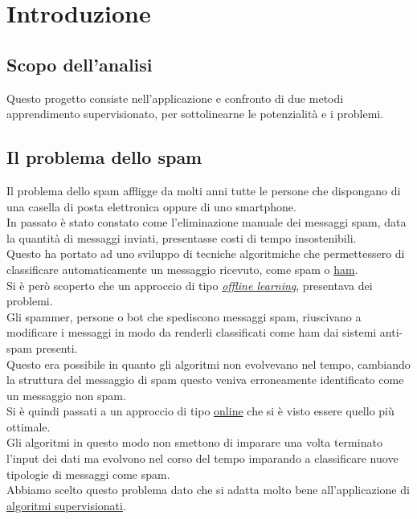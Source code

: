 \newpage
\section{Introduzione}
\subsection{Scopo dell'analisi}
Questo progetto consiste nell'applicazione e confronto di due metodi apprendimento supervisionato, per sottolinearne le potenzialità e i problemi.

\subsection{Il problema dello spam}
Il problema dello spam affligge da molti anni tutte le persone che dispongano di una casella di posta elettronica oppure di uno smartphone.\\
In passato è stato constato come l'eliminazione manuale dei messaggi spam, data la quantità di messaggi inviati, presentasse costi di tempo insostenibili.\\
Questo ha portato ad uno sviluppo di tecniche algoritmiche che permettessero di classificare automaticamente un messaggio ricevuto, come spam o \href{https://en.wiktionary.org/wiki/ham_e-mail}{ham}.\\
Si è però scoperto che un approccio di tipo \href{https://en.wikipedia.org/wiki/Offline_learning}{\textit{offline learning}}, presentava dei problemi.\\
Gli spammer, persone o bot che spediscono messaggi spam, riuscivano a modificare i messaggi in modo da renderli classificati come ham dai sistemi anti-spam presenti.\\
Questo era possibile in quanto gli algoritmi non evolvevano nel tempo, cambiando la struttura del messaggio di spam questo veniva erroneamente identificato come un messaggio non spam.\\
Si è quindi passati a un approccio di tipo \href{https://en.wikipedia.org/wiki/Online_algorithm}{online} che si è visto essere quello più ottimale.\\
Gli algoritmi in questo modo non smettono di imparare una volta terminato l'input dei dati ma evolvono nel corso del tempo imparando a classificare nuove tipologie di messaggi come spam.\\
Abbiamo scelto questo problema dato che si adatta molto bene all'applicazione di \href{https://en.wikipedia.org/wiki/Supervised_learning}{algoritmi supervisionati}. 
